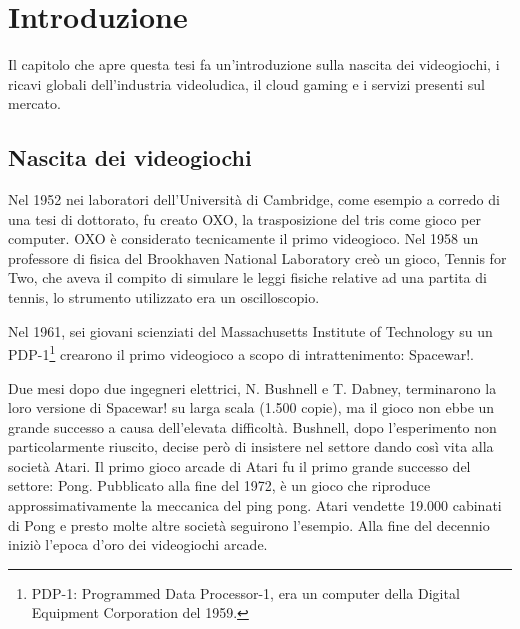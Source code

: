 %
%

\chapter{Introduzione}
\label{cap:Introduzione}

Il capitolo che apre questa tesi fa un'introduzione sulla nascita dei videogiochi, i ricavi globali dell'industria videoludica, il cloud gaming e i servizi presenti sul mercato.

\section{Nascita dei videogiochi}

Nel 1952 nei laboratori dell'Università di Cambridge, come esempio a corredo di una tesi di dottorato, fu creato OXO, la trasposizione del tris come gioco per computer. OXO è considerato tecnicamente il primo videogioco. Nel 1958 un professore di fisica del Brookhaven National Laboratory creò un gioco, Tennis for Two, che aveva il compito di simulare le leggi fisiche relative ad una partita di tennis, lo strumento utilizzato era un oscilloscopio.

Nel 1961, sei giovani scienziati del Massachusetts Institute of Technology su un PDP-1\footnote{PDP-1: Programmed Data Processor-1, era un computer della Digital Equipment Corporation del 1959.} crearono il primo videogioco a scopo di intrattenimento: Spacewar!.

Due mesi dopo due ingegneri elettrici, N. Bushnell e T. Dabney, terminarono la loro versione di Spacewar! su larga scala (1.500 copie), ma il gioco non ebbe un grande successo a causa dell'elevata difficoltà. Bushnell, dopo l'esperimento non particolarmente riuscito, decise però di insistere nel settore dando così vita alla società Atari. Il primo gioco arcade di Atari fu il primo grande successo del settore: Pong. Pubblicato alla fine del 1972, è un gioco che riproduce approssimativamente la meccanica del ping pong. Atari vendette 19.000 cabinati di Pong e presto molte altre società seguirono l'esempio. Alla fine del decennio iniziò l'epoca d'oro dei videogiochi arcade.


